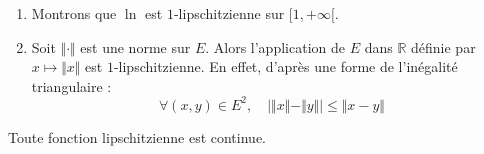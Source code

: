 \documentclass[french,11pt,twoside]{VcCours}
\begin{document}
\begin{Exemples}
\begin{enumerate}
\item Montrons que $\ln$ est $1$-lipschitzienne sur $[1, + \infty[$.


\vspace*{6cm}
%
\item Soit $\Vert \cdot \Vert$ est une norme sur $E$. Alors l'application de $E$ dans $\mathbb{R}$ définie par $x \mapsto \Vert x \Vert$ est $1$-lipschitzienne. En effet, d'après une forme de l'inégalité triangulaire :
$$ \forall (x,y) \in E^2, \quad \vert \Vert x \Vert - \Vert y \Vert \vert \leq \Vert x -y \Vert $$
\end{enumerate}
\end{Exemples}

\begin{Theoreme}{} Toute fonction lipschitzienne est continue. 
\end{Theoreme}

\begin{Demonstration}{} 
%
%
%

\vspace*{4cm}
\end{Demonstration}
\end{document}

